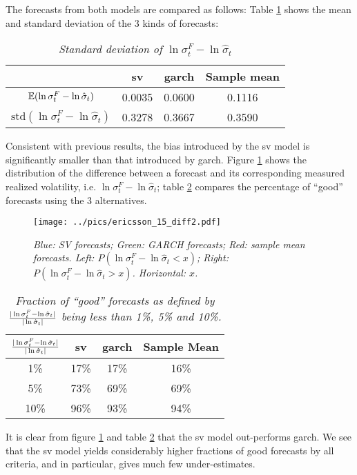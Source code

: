 The forecasts from both models are compared as follows: Table
\ref{tab:ericsson_15_diff1} shows the mean and standard deviation of
the 3 kinds of forecasts:
\begin{table}[htb!]
  \centering
  \begin{tabular}{|c|c|c|c|}
    \hline
    & \gls{sv} & \gls{garch} & Sample mean \\
    \hline
    $\mathbb{E}(\ln \sigma^F_t - \ln \hat{\sigma}_t)$ & 0.0035 &
    0.0600 & 0.1116 \\
    \hline
    $\text{std}(\ln \sigma^F_t - \ln \hat{\sigma}_t)$ & 0.3278 &
    0.3667 & 0.3590 \\
    \hline
  \end{tabular}
  \caption{\small \it Standard deviation of $\ln\sigma^F_t -
    \ln\hat{\sigma}_t$}
  \label{tab:ericsson_15_diff1}
\end{table}
Consistent with previous results, the bias introduced by the \gls{sv} model
is significantly smaller than that introduced by \gls{garch}. Figure
\ref{fig:ericsson_15_diff2} shows the distribution of the difference
between a forecast and its corresponding measured realized volatility,
i.e. $\ln\sigma^F_t - \ln\hat{\sigma}_t$; table
\ref{tab:ericsson_15_diff3} compares the percentage of ``good''
forecasts using the 3 alternatives.
\begin{figure}[htb!]
  \centering
    \texttt{[image: ../pics/ericsson\_15\_diff2.pdf]}
  \caption{\small \it Blue: SV forecasts; Green: GARCH forecasts; Red:
    sample mean forecasts. Left: $P(\ln \sigma^F_t - \ln \hat{\sigma}_t < x)$;
    Right: $P(\ln \sigma^F_t - \ln \hat{\sigma}_t > x)$. Horizontal: $x$.}
  \label{fig:ericsson_15_diff2}
\end{figure}

\begin{table}[htb!]
  \centering
  \begin{tabular}{|c|c|c|c|}
    \hline
    ${|\ln \sigma^F_t - \ln \hat{\sigma}_t| \over |\ln
      \hat{\sigma}_t|}$ &
    \gls{sv} & \gls{garch} & Sample Mean \\
    \hline
    1\% & 17\% & 17\% & 16\% \\
    \hline
    5\% & 73\% & 69\% & 69\% \\
    \hline
    10\% & 96\% & 93\% & 94\% \\
    \hline
  \end{tabular}
  \caption{\small \it Fraction of ``good'' forecasts as defined by
    ${|\ln \sigma^F_t - \ln \hat{\sigma}_t| \over |\ln
      \hat{\sigma}_t|}$ being less than 1\%, 5\% and 10\%.}
  \label{tab:ericsson_15_diff3}
\end{table}
It is clear from figure \ref{fig:ericsson_15_diff2} and table
\ref{tab:ericsson_15_diff3} that the \gls{sv} model out-performs \gls{garch}. We
see that the \gls{sv} model yields considerably higher fractions of good
forecasts by all criteria, and in particular, gives much few
under-estimates.

